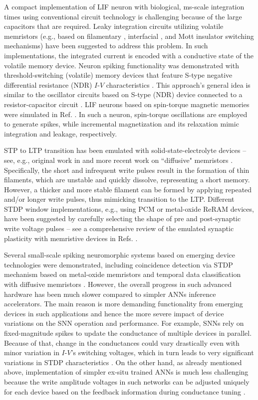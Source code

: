 A compact implementation of LIF neuron with biological, ms-scale integration times using conventional circuit technology is challenging because of the large capacitors that are required. Leaky integration circuits utilizing volatile memristors (e.g., based on filamentary \cite{Zhang2018Small}, interfacial \cite{Lashkare2018}, and Mott insulator \cite{Adda2018} switching mechanisms) have been suggested to address this problem. In such implementations, the integrated current is encoded with a conductive state of the volatile memory device. Neuron spiking functionality was demonstrated with threshold-switching (volatile) memory devices that feature S-type negative differential resistance (NDR) $I$-$V$ characteristics \cite{Pickett2013}. This approach's general idea is similar to the oscillator circuits based on S-type (NDR) device connected to a resistor-capacitor circuit \cite{Kesim2019}. LIF neurons based on spin-torque magnetic memories were simulated in Ref. \cite{Sengupta2016}. In such a neuron,  spin-torque oscillations are employed to generate spikes, while incremental magnetization and its relaxation mimic integration and leakage, respectively.

STP to LTP transition has been emulated with solid-state-electrolyte devices – see, e.g., original work in \cite{Ohno2011} and more recent work on ``diffusive" memristors \cite{Wang2017NatMat}. Specifically, the short and infrequent write pulses result in the formation of thin filaments, which are unstable and quickly dissolve, representing a short memory. However, a thicker and more stable filament can be formed by applying repeated and/or longer write pulses, thus mimicking transition to the LTP.  Different STDP window implementations, e.g., using PCM \cite{Kuzum2011} or metal-oxide ReRAM \cite{Prezioso2016} devices, have been suggested by carefully selecting the shape of pre and post-synaptic write voltage pulses – see a comprehensive review of the emulated synaptic plasticity with memristive devices in Refs. \cite{Serrano-Gotarredona2013, Saighi2015}.

Several small-scale spiking neuromorphic systems based on emerging device technologies were demonstrated, including coincidence detection via STDP mechanism based on metal-oxide memristors \cite{Prezioso2018, Pedretti2017} and temporal data classification with diffusive memristors \cite{Wang2018NatElec}.  However, the overall progress in such advanced hardware has been much slower compared to simpler ANNs inference accelerators. The main reason is more demanding functionality from emerging devices in such applications and hence the more severe impact of device variations on the SNN operation and performance. For example, SNNs rely on fixed-magnitude spikes to update the conductance of multiple devices in parallel. Because of that, change in the conductances could vary drastically even with minor variation in $I$-$V$'s switching voltages, which in turn leads to very significant variations in STDP characteristics \cite{Prezioso2018}. On the other hand, as already mentioned above, implementation of simpler ex-situ trained ANNs is much less challenging because the write amplitude voltages in such networks can be adjusted uniquely for each device based on the feedback information during conductance tuning \cite{Alibart2012}. 

